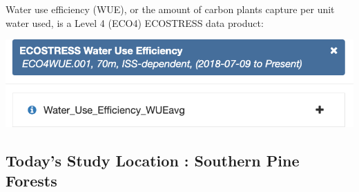 \documentclass[oneside,a4paper,11pt,explicit]{book}
\begin{document}
Water use efficiency (WUE), or the amount of carbon plants capture per unit water used, is a Level 4 (ECO4) ECOSTRESS data product:

\vspace{.5em}

\centerline{\includegraphics[width=.6\textwidth]{WUEecostress.png}}

\subsection{Today's Study Location : Southern Pine Forests}
\end{document}
